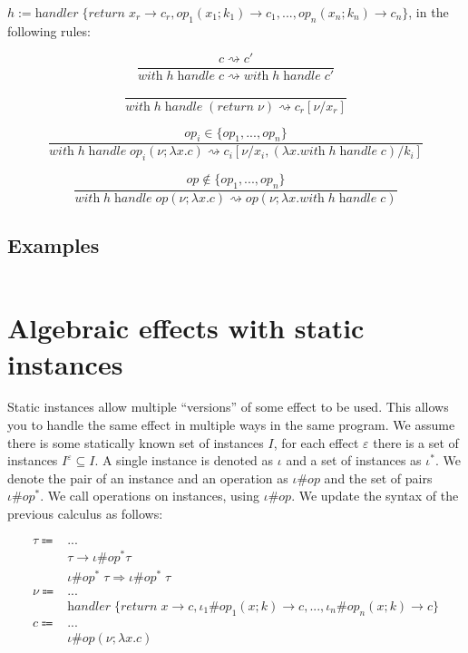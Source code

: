 \documentclass[12pt]{article}
\newcommand\eff[0]{\varepsilon}
\newcommand\eop[0]{\textit{op}}
\newcommand\allinsts[0]{I}
\newcommand\insts[1]{\allinsts^{#1}}
\newcommand\inst[0]{\iota}
\newcommand\instss[0]{\inst^*}
\newcommand\type[0]{\tau}
\newcommand\tarr[2]{#1 \rightarrow #2}
\newcommand\thandler[4]{#1 \; #2 \Rightarrow #3 \; #4}
\newcommand\val[0]{\nu}
\newcommand\vabs[2]{\lambda #1 . #2}
\newcommand\vhandler[1]{\textit{handler} \; \{#1\}}
\newcommand\vhandlerci[0]{\vhandler{
	\textit{return} \; x \rightarrow \comp,
	\inst_1\#\eop_1(x ; k) \rightarrow \comp,
	...,
	\inst_n\#\eop_n(x ; k) \rightarrow \comp
}}
\newcommand\comp[0]{c}
\newcommand\creturn[1]{\textit{return} \; #1}
\newcommand\cop[4]{#1(#2 ; \lambda #3 . #4)}
\newcommand\copi[5]{#1 \# #2(#3 ; \lambda #4 . #5)}
\newcommand\chandle[2]{\textit{with} \; #1 \; \textit{handle} \; #2}
\begin{document}
\vspace{20pt}
$h := \vhandler{
		\textit{return} \; x_r \rightarrow \comp_r,
		\eop_1 (  x_1 ; k_1 ) \rightarrow \comp_1,
		...,
		\eop_n ( x_n ; k_n ) \rightarrow \comp_n
	}$, in the following rules:\\
	
\begin{minipage}{0.5\textwidth}
\[\frac{
	\comp \rightsquigarrow \comp'
}{
	\chandle{h}{\comp} \rightsquigarrow \chandle{h}{\comp'}
}\]
\end{minipage}
\begin{minipage}{0.5\textwidth}
\[\frac{
}{
	\chandle{h}{(\creturn{\val})} \rightsquigarrow \comp_r[\val / x_r]
}\]
\end{minipage}
\vspace{20pt}
\[\frac{
	\eop_i \in \{ \eop_1, ..., \eop_n \}
}{
	\chandle{h}{\cop{\eop_i}{\val}{x}{\comp}} \rightsquigarrow \comp_i[\val / x_i, (\vabs{x}{\chandle{h}{\comp}}) / k_i]
}\]

\[\frac{
	\eop \notin \{ \eop_1, ..., \eop_n \}
}{
	\chandle{h}{\cop{\eop}{\val}{x}{\comp}} \rightsquigarrow \cop{\eop}{\val}{x}{\chandle{h}{\comp}}
}\]

\subsection{Examples}
\inputminted{haskell}{code3.txt}

\newpage
\section{Algebraic effects with static instances}

Static instances allow multiple ``versions'' of some effect to be used. This allows you to handle the same effect in multiple ways in the same program. We assume there is some statically known set of instances $\allinsts$, for each effect $\eff$ there is a set of instances $\insts{\eff} \subseteq \allinsts$. A single instance is denoted as $\inst$ and a set of instances as $\instss$. We denote the pair of an instance and an operation as $\inst\#\eop$ and the set of pairs $\inst\#\eop^*$. We call operations on instances, using $\inst\#\eop$. We update the syntax of the previous calculus as follows:

\begin{align*}
	\type \Coloneqq 	& ...									\tag{types} \\
				& \tarr{\type}{\inst\#\eop^*}{\type}				\tag{type of functions}\\
				& \thandler{\inst\#\eop^*}{\type}{\inst\#\eop^*}{\type}	\tag{type of handlers} \\
	\val \Coloneqq	& ...									\tag{values} \\
				& \vhandlerci								\tag{handler} \\
	\comp \Coloneqq	& ...									\tag{computations} \\
				& \copi{\inst}{\eop}{\val}{x}{\comp}				\tag{operation call} \\
\end{align*}
\end{document}
